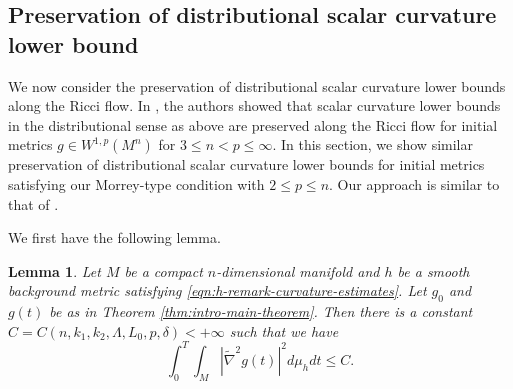 \documentclass[12pt]{amsart}
\newcommand{\hdel}{\tilde{\nabla}}
\newtheorem{lma}[thm]{Lemma}
\theoremstyle{remark}
\numberwithin{equation}{section}
\begin{document}
\newpage

\subsection{Preservation of distributional scalar curvature lower bound}
We now consider the preservation of distributional scalar curvature lower bounds along the Ricci flow. In \cite{jiang_weak_2021}, the authors showed that scalar curvature lower bounds in the distributional sense as above are preserved along the Ricci flow for initial metrics $g \in W^{1,p}(M^n)$ for $3 \leq n < p \leq \infty$. In this section, we show similar preservation of distributional scalar curvature lower bounds for initial metrics satisfying our Morrey-type condition with $2 \leq p \leq n$. Our approach is similar to that of \cite{jiang_weak_2021}.

We first have the following lemma.

\begin{lma}\label{lem:hessiansquared-spacetime-integrability}
    Let $M$ be a compact $n$-dimensional manifold and $h$ be a smooth background metric satisfying \eqref{eqn:h-remark-curvature-estimates}. Let $g_0$ and $g(t)$ be as in Theorem \ref{thm:intro-main-theorem}. Then there is a constant $C = C(n, k_1, k_2, \Lambda, L_0, p, \delta) < +\infty$ such that we have
    \begin{equation*}
        \int_0^T \int_M |\hdel^2 g(t)|^2 d\mu_h dt \leq C.
    \end{equation*}
\end{lma}
\end{document}
